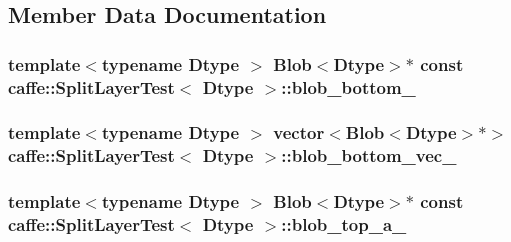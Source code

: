 \subsection{Member Data Documentation}
\hypertarget{classcaffe_1_1_split_layer_test_a0902834bf63f00ca3e17a29887e4da4f}{
\subsubsection[{blob\+\_\+bottom\+\_\+}]{\setlength{\rightskip}{0pt plus 5cm}template$<$typename Dtype $>$ {\bf Blob}$<$Dtype$>$$\ast$ const {\bf caffe\+::\+Split\+Layer\+Test}$<$ Dtype $>$\+::blob\+\_\+bottom\+\_\+\hspace{0.3cm}{\ttfamily [protected]}}}\label{classcaffe_1_1_split_layer_test_a0902834bf63f00ca3e17a29887e4da4f}
\hypertarget{classcaffe_1_1_split_layer_test_af3697bcedb6899ece2374d73a2d5be0c}{
\subsubsection[{blob\+\_\+bottom\+\_\+vec\+\_\+}]{\setlength{\rightskip}{0pt plus 5cm}template$<$typename Dtype $>$ vector$<${\bf Blob}$<$Dtype$>$$\ast$$>$ {\bf caffe\+::\+Split\+Layer\+Test}$<$ Dtype $>$\+::blob\+\_\+bottom\+\_\+vec\+\_\+\hspace{0.3cm}{\ttfamily [protected]}}}\label{classcaffe_1_1_split_layer_test_af3697bcedb6899ece2374d73a2d5be0c}
\hypertarget{classcaffe_1_1_split_layer_test_a8d0384e28d23ffdd556815e88d6331c9}{
\subsubsection[{blob\+\_\+top\+\_\+a\+\_\+}]{\setlength{\rightskip}{0pt plus 5cm}template$<$typename Dtype $>$ {\bf Blob}$<$Dtype$>$$\ast$ const {\bf caffe\+::\+Split\+Layer\+Test}$<$ Dtype $>$\+::blob\+\_\+top\+\_\+a\+\_\+\hspace{0.3cm}{\ttfamily [protected]}}}\label{classcaffe_1_1_split_layer_test_a8d0384e28d23ffdd556815e88d6331c9}
